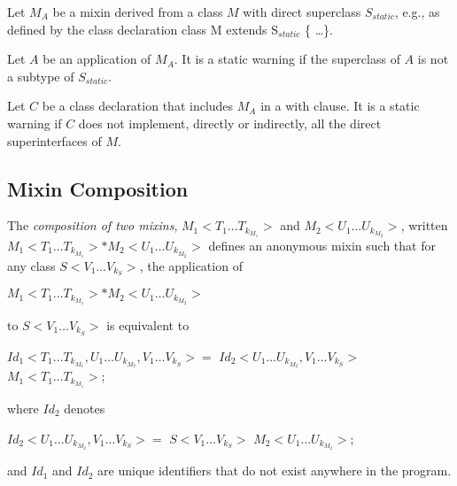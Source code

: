 \documentclass{article}
\newcommand{\code}[1]{{\sf #1}}
\begin{document}
Let $M_A$ be a mixin derived from a class $M$ with direct superclass $S_{static}$, e.g., as defined by the class declaration \code{class M extends S$_{static}$ \{ \ldots \}}.

Let $A$ be an application of $M_A$. It is a static warning if the superclass of $A$ is not a subtype of $S_{static}$.

Let $C$ be a class declaration that includes $M_A$ in a with clause. It is a static warning if $C$ does not implement, directly or indirectly, all the direct superinterfaces of $M$.


\subsection{Mixin Composition}


\LMHash{}
The {\em composition of two mixins}, $M_1<T_1 \ldots T_{k_{M_1}}>$ and $M_2<U_1  \ldots U_{k_{M_2}}>$, written $M_1<T_1 \ldots T_{k_{M_1}}> * M_2<U_1  \ldots U_{k_{M_2}}>$ defines an anonymous mixin such that for any class $S<V_1 \ldots V_{k_S}>$, the application of

$M_1<T_1 \ldots T_{k_{M_1}}> * M_2<U_1  \ldots U_{k_{M_2}}>$

to $S<V_1 \ldots V_{k_S}>$ is equivalent to

\begin{dartCode}
\ABSTRACT{} \CLASS{} $Id_1<T_1  \ldots T_{k_{M_1}}, U_1  \ldots U_{k_{M_2}}, V_1  \ldots V_{k_S}> = $
      $Id_2<U_1  \ldots U_{k_{M_2}}, V_1  \ldots V_{k_S}>$ \WITH{} $M_1 <T_1  \ldots T_{k_{M_1}}>$;
\end{dartCode}

where $Id_2$ denotes

\begin{dartCode}
\ABSTRACT{}  \CLASS{} $Id_2<U_1 \ldots U_{k_{M_2}}, V_1 \ldots V_{k_S}> =$
                         $S<V_1 \ldots V_{k_S}>$ \WITH{} $M_2<U_1  \ldots U_{k_{M_2}}>$;
\end{dartCode}

and $Id_1$ and $Id_2$ are unique identifiers that do not exist anywhere in the program.

\end{document}
